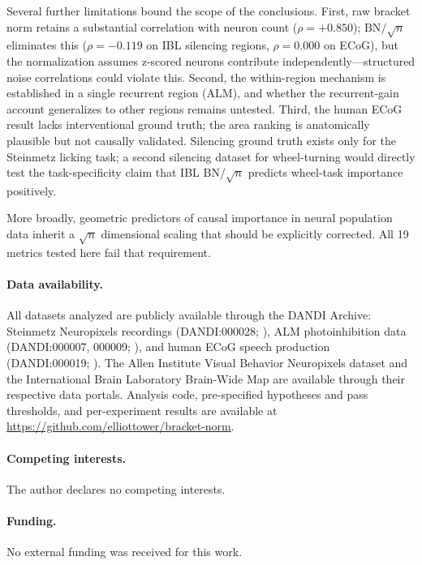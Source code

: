 \documentclass[9pt,lineno]{elife}
\begin{document}
Several further limitations bound the scope of the conclusions. First, raw bracket norm retains a substantial correlation with neuron count ($\rho = +0.850$); $\text{BN}/\!\sqrt{n}$ eliminates this ($\rho = -0.119$ on IBL silencing regions, $\rho = 0.000$ on ECoG), but the normalization assumes z-scored neurons contribute independently---structured noise correlations could violate this. Second, the within-region mechanism is established in a single recurrent region (ALM), and whether the recurrent-gain account generalizes to other regions remains untested. Third, the human ECoG result lacks interventional ground truth; the area ranking is anatomically plausible but not causally validated. Silencing ground truth exists only for the Steinmetz licking task; a second silencing dataset for wheel-turning would directly test the task-specificity claim that IBL $\text{BN}/\!\sqrt{n}$ predicts wheel-task importance positively.

More broadly, geometric predictors of causal importance in neural population data inherit a $\sqrt{n}$ dimensional scaling that should be explicitly corrected. All 19 metrics tested here fail that requirement.

\paragraph{Data availability.} All datasets analyzed are publicly available through the DANDI Archive: Steinmetz Neuropixels recordings (DANDI:000028; \citealp{steinmetz2019distributed, zatkahaas2021}), ALM photoinhibition data (DANDI:000007, 000009; \citealp{svoboda_alm, dandi000007, dandi000009}), and human ECoG speech production (DANDI:000019; \citealp{dandi000019}). The Allen Institute Visual Behavior Neuropixels dataset \citep{siegle2021survey} and the International Brain Laboratory Brain-Wide Map \citep{ibl2025brainwide} are available through their respective data portals. Analysis code, pre-specified hypotheses and pass thresholds, and per-experiment results are available at \url{https://github.com/elliottower/bracket-norm}.

\paragraph{Competing interests.} The author declares no competing interests.

\paragraph{Funding.} No external funding was received for this work.
\end{document}
